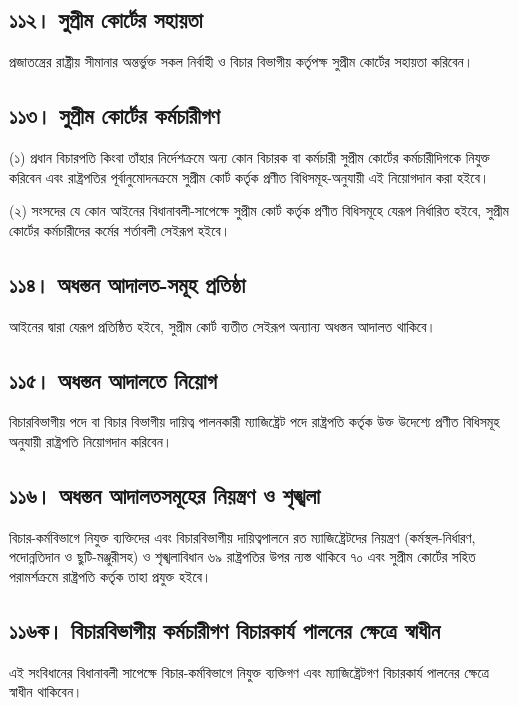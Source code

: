 \documentclass[11pt]{article}
\begin{document}
\subsection{১১২। সুপ্রীম কোর্টের সহায়তা}
\label{sec:org9da219c}
প্রজাতন্ত্রের রাষ্ট্রীয় সীমানার অন্তর্ভুক্ত সকল নির্বাহী ও বিচার বিভাগীয় কর্তৃপক্ষ
সুপ্রীম কোর্টের সহায়তা করিবেন।

\subsection{১১৩। সুপ্রীম কোর্টের কর্মচারীগণ}
\label{sec:org8bbe5ec}
(১) প্রধান বিচারপতি কিংবা তাঁহার নির্দেশক্রমে অন্য কোন বিচারক বা কর্মচারী
    সুপ্রীম কোর্টের কর্মচারীদিগকে নিযুক্ত করিবেন এবং রাষ্ট্রপতির পূর্বানুমোদনক্রমে
    সুপ্রীম কোর্ট কর্তৃক প্রণীত বিধিসমূহ-অনুযায়ী এই নিয়োগদান করা হইবে।

(২) সংসদের যে কোন আইনের বিধানাবলী-সাপেক্ষে সুপ্রীম কোর্ট কর্তৃক প্রণীত
    বিধিসমূহে যেরূপ নির্ধারিত হইবে, সুপ্রীম কোর্টের কর্মচারীদের কর্মের শর্তাবলী
    সেইরূপ হইবে।

\subsection{১১৪। অধস্তন আদালত-সমূহ প্রতিষ্ঠা}
\label{sec:orgbb09beb}
আইনের দ্বারা যেরূপ প্রতিষ্ঠিত হইবে, সুপ্রীম কোর্ট ব্যতীত সেইরূপ অন্যান্য অধস্তন
আদালত থাকিবে।

\subsection{১১৫। অধস্তন আদালতে নিয়োগ}
\label{sec:orgb872a45}
বিচারবিভাগীয় পদে বা বিচার বিভাগীয় দায়িত্ব পালনকারী ম্যাজিষ্ট্রেট পদে
রাষ্ট্রপতি কর্তৃক উক্ত উদেশ্যে প্রণীত বিধিসমূহ অনুযায়ী রাষ্ট্রপতি নিয়োগদান
করিবেন।

\subsection{১১৬। অধস্তন আদালতসমূহের নিয়ন্ত্রণ ও শৃঙ্খলা}
\label{sec:orge89a0dc}
বিচার-কর্মবিভাগে নিযুক্ত ব্যক্তিদের এবং বিচারবিভাগীয় দায়িত্বপালনে রত
ম্যাজিষ্ট্রেটদের নিয়ন্ত্রণ (কর্মস্থল-নির্ধারণ, পদোন্নতিদান ও ছুটি-মঞ্জুরীসহ) ও
শৃঙ্খলাবিধান ৬৯ রাষ্ট্রপতির উপর ন্যস্ত থাকিবে ৭০ এবং সুপ্রীম কোর্টের সহিত
পরামর্শক্রমে রাষ্ট্রপতি কর্তৃক তাহা প্রযুক্ত হইবে।

\subsection{১১৬ক। বিচারবিভাগীয় কর্মচারীগণ বিচারকার্য পালনের ক্ষেত্রে স্বাধীন}
\label{sec:org9d400ea}
এই সংবিধানের বিধানাবলী সাপেক্ষে বিচার-কর্মবিভাগে নিযুক্ত ব্যক্তিগণ এবং
ম্যাজিষ্ট্রেটগণ বিচারকার্য পালনের ক্ষেত্রে স্বাধীন থাকিবেন।
\end{document}
